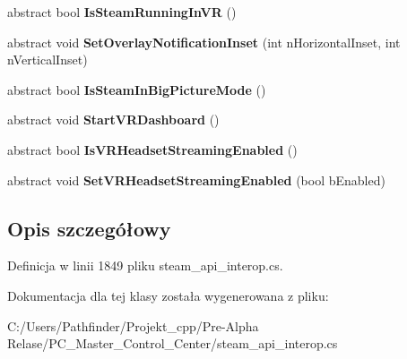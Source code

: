 \begin{DoxyCompactItemize}
abstract bool {\bfseries Is\+Steam\+Running\+In\+VR} ()
\item 
\mbox{\label{class_valve_1_1_steamworks_1_1_i_steam_utils_af80a5dc8cc523a44d3dffb3e5a67bd1f}} 
abstract void {\bfseries Set\+Overlay\+Notification\+Inset} (int n\+Horizontal\+Inset, int n\+Vertical\+Inset)
\item 
\mbox{\label{class_valve_1_1_steamworks_1_1_i_steam_utils_aacb657ea55e35c78bab7ffb3ab87d15e}} 
abstract bool {\bfseries Is\+Steam\+In\+Big\+Picture\+Mode} ()
\item 
\mbox{\label{class_valve_1_1_steamworks_1_1_i_steam_utils_ab83e9aadf2ea0f1d1c63388e845c2d7a}} 
abstract void {\bfseries Start\+V\+R\+Dashboard} ()
\item 
\mbox{\label{class_valve_1_1_steamworks_1_1_i_steam_utils_adcbb758f15c666dd4e0651d36288e1c7}} 
abstract bool {\bfseries Is\+V\+R\+Headset\+Streaming\+Enabled} ()
\item 
\mbox{\label{class_valve_1_1_steamworks_1_1_i_steam_utils_abbfaef153937ba51a6889d2717cad55a}} 
abstract void {\bfseries Set\+V\+R\+Headset\+Streaming\+Enabled} (bool b\+Enabled)
\end{DoxyCompactItemize}


\subsection{Opis szczegółowy}


Definicja w linii 1849 pliku steam\+\_\+api\+\_\+interop.\+cs.



Dokumentacja dla tej klasy została wygenerowana z pliku\+:\begin{DoxyCompactItemize}
\item 
C\+:/\+Users/\+Pathfinder/\+Projekt\+\_\+cpp/\+Pre-\/\+Alpha Relase/\+P\+C\+\_\+\+Master\+\_\+\+Control\+\_\+\+Center/steam\+\_\+api\+\_\+interop.\+cs\end{DoxyCompactItemize}
